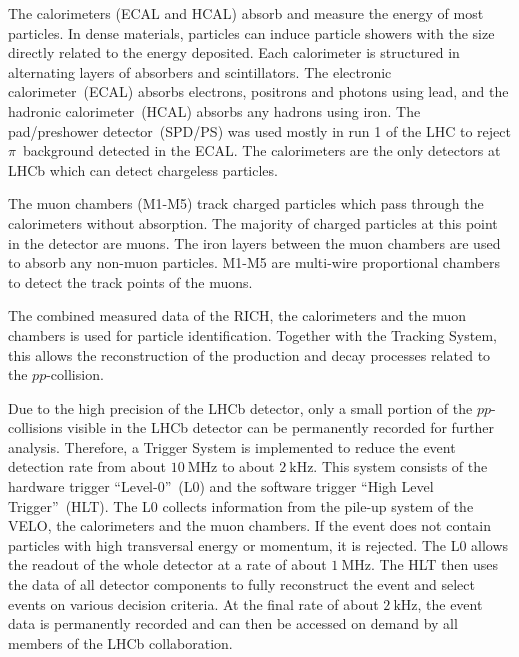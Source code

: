 The calorimeters (ECAL and HCAL) absorb and measure the energy of most particles.
In dense materials, particles can induce particle showers with the size directly related to the energy deposited.
Each calorimeter is structured in alternating layers of absorbers and scintillators. 
The electronic calorimeter~(ECAL) absorbs electrons, positrons and photons using lead, and the hadronic calorimeter~(HCAL) absorbs any hadrons using iron.
The pad/preshower detector~(SPD/PS) was used mostly in run 1 of the LHC to reject $\pi$~background detected in the ECAL.
The calorimeters are the only detectors at LHCb which can detect chargeless particles.

The muon chambers (M1-M5) track charged particles which pass through the calorimeters without absorption.
The majority of charged particles at this point in the detector are muons.
The iron layers between the muon chambers are used to absorb any non-muon particles.
M1-M5 are multi-wire proportional chambers to detect the track points of the muons.

The combined measured data of the RICH, the calorimeters and the muon chambers is used for particle identification.
Together with the Tracking System, this allows the reconstruction of the production and decay processes related to the $pp$-collision.

Due to the high precision of the LHCb detector, only a small portion of the $pp$-collisions visible in the LHCb detector can be permanently recorded for further analysis.
Therefore, a Trigger System is implemented to reduce the event detection rate from about $\qty{10}{\MHz}$ to about $\qty{2}{\kHz}$.
This system consists of the hardware trigger \enquote{Level-0}~(L0) and the software trigger \enquote{High Level Trigger}~(HLT).
The L0 collects information from the pile-up system of the VELO, the calorimeters and the muon chambers.
If the event does not contain particles with high transversal energy or momentum, it is rejected.
The L0 allows the readout of the whole detector at a rate of about $\qty{1}{\MHz}$.
The HLT then uses the data of all detector components to fully reconstruct the event and select events on various decision criteria.
At the final rate of about $\qty{2}{\kHz}$, the event data is permanently recorded and can then be accessed on demand by all members of the LHCb collaboration.
